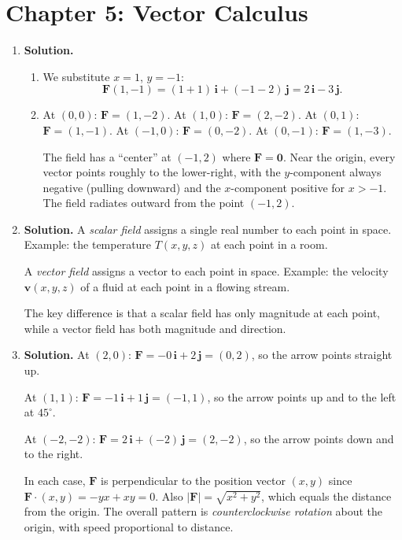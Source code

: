 \chapter{Chapter 5: Vector Calculus}

\begin{enumerate}

\item \textbf{Solution.}
\begin{enumerate}
\item We substitute $x=1$, $y=-1$:
\[
\mathbf{F}(1,-1) = (1+1)\,\mathbf{i} + (-1-2)\,\mathbf{j} = 2\,\mathbf{i} - 3\,\mathbf{j}.
\]

\item At $(0,0)$: $\mathbf{F}=(1,-2)$. At $(1,0)$: $\mathbf{F}=(2,-2)$. At $(0,1)$: $\mathbf{F}=(1,-1)$. At $(-1,0)$: $\mathbf{F}=(0,-2)$. At $(0,-1)$: $\mathbf{F}=(1,-3)$.

The field has a ``center'' at $(-1,2)$ where $\mathbf{F}=\mathbf{0}$. Near the origin, every vector points roughly to the lower-right, with the $y$-component always negative (pulling downward) and the $x$-component positive for $x>-1$. The field radiates outward from the point $(-1,2)$.
\end{enumerate}

\item \textbf{Solution.}
A \emph{scalar field} assigns a single real number to each point in space. Example: the temperature $T(x,y,z)$ at each point in a room.

A \emph{vector field} assigns a vector to each point in space. Example: the velocity $\mathbf{v}(x,y,z)$ of a fluid at each point in a flowing stream.

The key difference is that a scalar field has only magnitude at each point, while a vector field has both magnitude and direction.

\item \textbf{Solution.}
At $(2,0)$: $\mathbf{F} = -0\,\mathbf{i} + 2\,\mathbf{j} = (0,2)$, so the arrow points straight up.

At $(1,1)$: $\mathbf{F} = -1\,\mathbf{i} + 1\,\mathbf{j} = (-1,1)$, so the arrow points up and to the left at $45^\circ$.

At $(-2,-2)$: $\mathbf{F} = 2\,\mathbf{i} + (-2)\,\mathbf{j} = (2,-2)$, so the arrow points down and to the right.

In each case, $\mathbf{F}$ is perpendicular to the position vector $(x,y)$ since $\mathbf{F}\cdot(x,y)= -yx + xy = 0$. Also $|\mathbf{F}| = \sqrt{x^2+y^2}$, which equals the distance from the origin. The overall pattern is \emph{counterclockwise rotation} about the origin, with speed proportional to distance.


\end{enumerate}
